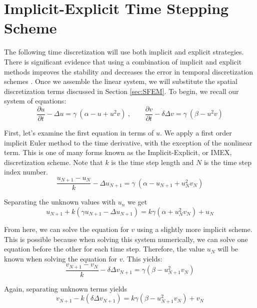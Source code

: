 \documentclass[12pt]{article}
\begin{document}
\section{Implicit-Explicit Time Stepping Scheme}\label{sec:imex}

The following time discretization will use both implicit and explicit strategies. There is significant evidence that using a combination of implicit and explicit methods improves the stability and decreases the error in temporal discretization schemes \cite{Madzamuse}. Once we assemble the  linear system, we will substitute the spatial discretization terms discussed in Section \ref{sec:SFEM}. To begin, we recall our system of equations:
\begin{equation}
\frac{\partial u}{\partial t} - \Delta u = \gamma~(\alpha - u + u^2v) ~,~~~~~~~~~
\frac{\partial v}{\partial t} - \delta\Delta v = \gamma~(\beta - u^2v)
\end{equation}

\noindent First, let's examine the first equation in terms of $u$. We apply a first order implicit Euler method to the time derivative, with the exception of the nonlinear term. This is one of many forms known as the Implicit-Explicit, or IMEX, discretization scheme. Note that $k$ is the time step length and $N$ is the time step index number.
\begin{equation}
\frac{u_{N+1} - u_{N}}{k} - \Delta u_{N+1} = \gamma~(\alpha - u_{N+1} + u_{N}^2v_{N}) 
\end{equation}

\noindent Separating the unknown values with $u_n$ we get
\begin{equation}
u_{N+1}+k\left(\gamma u_{N+1} - \Delta u_{N+1}\right) = k\gamma\left(\alpha + u_{N}^2v_{N} \right) + u_{N}
\end{equation}


From here, we can solve the equation for $v$ using a slightly more implicit scheme. This is possible because when solving this system numerically, we can solve one equation before the other for each time step. Therefore, the value $u_N$ will be known when solving the equation for $v$. This yields:
\begin{equation}
\frac{v_{N+1} - v_{N}}{k} - \delta\Delta v_{N+1} = \gamma(\beta - u_{N+1}^2v_{N})
\end{equation}

\noindent Again, separating unknown terms yields
\begin{equation}
v_{N+1}-k\left(\delta\Delta v_{N+1}\right) = k\gamma\left(\beta - u_{N+1}^2v_{N} \right) + v_{N}
\end{equation}
\end{document}
